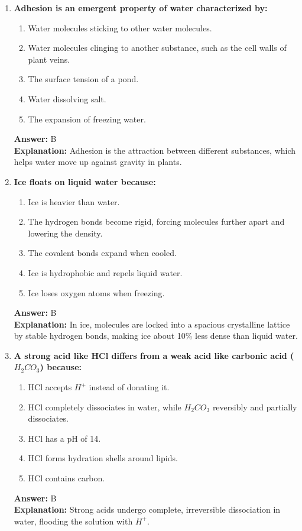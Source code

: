 \documentclass[11pt, a4paper]{article}
\begin{document}
\begin{enumerate}
\item \textbf{Adhesion is an emergent property of water characterized by:}
\begin{enumerate}[label=\Alph*.]
    \item Water molecules sticking to other water molecules.
    \item Water molecules clinging to another substance, such as the cell walls of plant veins.
    \item The surface tension of a pond.
    \item Water dissolving salt.
    \item The expansion of freezing water.
\end{enumerate}
\textbf{Answer:} B \\
\textbf{Explanation:} Adhesion is the attraction between different substances, which helps water move up against gravity in plants.

\item \textbf{Ice floats on liquid water because:}
\begin{enumerate}[label=\Alph*.]
    \item Ice is heavier than water.
    \item The hydrogen bonds become rigid, forcing molecules further apart and lowering the density.
    \item The covalent bonds expand when cooled.
    \item Ice is hydrophobic and repels liquid water.
    \item Ice loses oxygen atoms when freezing.
\end{enumerate}
\textbf{Answer:} B \\
\textbf{Explanation:} In ice, molecules are locked into a spacious crystalline lattice by stable hydrogen bonds, making ice about 10\% less dense than liquid water.

\item \textbf{A strong acid like HCl differs from a weak acid like carbonic acid ($H_2CO_3$) because:}
\begin{enumerate}[label=\Alph*.]
    \item HCl accepts $H^+$ instead of donating it.
    \item HCl completely dissociates in water, while $H_2CO_3$ reversibly and partially dissociates.
    \item HCl has a pH of 14.
    \item HCl forms hydration shells around lipids.
    \item HCl contains carbon.
\end{enumerate}
\textbf{Answer:} B \\
\textbf{Explanation:} Strong acids undergo complete, irreversible dissociation in water, flooding the solution with $H^+$.


\end{enumerate}
\end{document}
